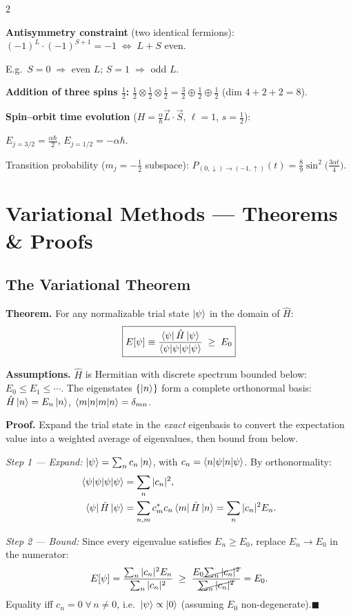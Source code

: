 \documentclass[9pt,a4paper]{article} %
\newcommand{\Hhat}{\hat{H}}
\begin{document}
\begin{multicols}{2}
{\footnotesize
\textbf{Antisymmetry constraint} (two identical fermions):
$(-1)^L\cdot(-1)^{S+1}=-1\;\Leftrightarrow\;L+S$ even.

E.g.\ $S=0\;\Rightarrow$ even $L$;\; $S=1\;\Rightarrow$ odd $L$.

\textbf{Addition of three spins $\frac{1}{2}$:}
$\frac{1}{2}\otimes\frac{1}{2}\otimes\frac{1}{2}=\frac{3}{2}\oplus\frac{1}{2}\oplus\frac{1}{2}$\;
(dim $4+2+2=8$).

\textbf{Spin--orbit time evolution} ($H=\frac{\alpha}{\hbar}\vec{L}\cdot\vec{S}$, $\ell=1$, $s=\frac{1}{2}$):

$E_{j=3/2}=\frac{\alpha\hbar}{2}$,\;
$E_{j=1/2}=-\alpha\hbar$.

Transition probability ($m_j=-\frac{1}{2}$ subspace):
$P_{(0,\downarrow)\to(-1,\uparrow)}(t)=\frac{8}{9}\sin^2\!\bigl(\frac{3\alpha t}{4}\bigr)$.
}
\section{Variational Methods — Theorems \& Proofs}

\subsection{The Variational Theorem}
\textbf{Theorem.} For any normalizable trial state $\ket{\psi}$ in the domain of $\Hhat$:
\[
\boxed{E[\psi]\equiv\frac{\bra{\psi}\Hhat\ket{\psi}}{\braket{\psi|\psi}}\;\ge\; E_0}
\]

\textbf{Assumptions.} $\Hhat$ is Hermitian with discrete spectrum bounded below: $E_0\le E_1\le\cdots$\;. The eigenstates $\{\ket{n}\}$ form a complete orthonormal basis: $\Hhat\ket{n}=E_n\ket{n}$, $\braket{m|n}=\delta_{mn}$.

\textbf{Proof.} Expand the trial state in the \emph{exact} eigenbasis to convert the expectation value into a weighted average of eigenvalues, then bound from below.

\emph{Step 1 — Expand:} $\ket{\psi}=\sum_n c_n\ket{n}$, with $c_n=\braket{n|\psi}$.
By orthonormality:
\begin{align*}
\braket{\psi|\psi}&=\sum_n|c_n|^2,\\
\bra{\psi}\Hhat\ket{\psi}&=\sum_{n,m}c_m^* c_n\bra{m}\Hhat\ket{n}=\sum_n|c_n|^2 E_n.
\end{align*}

\emph{Step 2 — Bound:} Since every eigenvalue satisfies $E_n\ge E_0$, replace $E_n\to E_0$ in the numerator:
\[
E[\psi]=\frac{\sum_n|c_n|^2 E_n}{\sum_n|c_n|^2}
\;\ge\;\frac{E_0\cancel{\sum_n|c_n|^2}}{\cancel{\sum_n|c_n|^2}}=E_0.
\]
Equality iff $c_n=0\;\forall\,n\neq 0$, i.e.\ $\ket{\psi}\propto\ket{0}$ (assuming $E_0$ non-degenerate).\hfill$\blacksquare$


\end{multicols}
\end{document}
